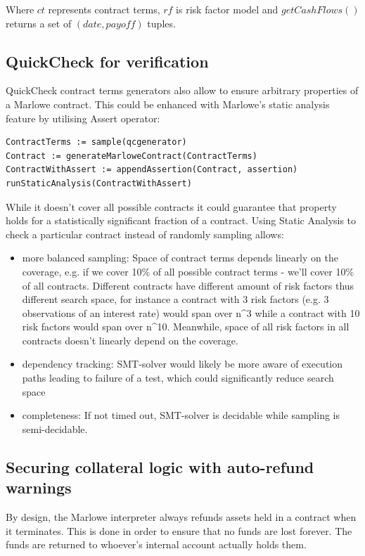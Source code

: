 \documentclass[runningheads]{llncs}
\begin{document}
Where $ct$ represents contract terms, $rf$ is risk factor model and
$getCashFlows()$ returns a set of $(date,payoff)$ tuples.

\subsection{QuickCheck for verification}

QuickCheck\cite{qc} contract terms generators also allow to ensure
arbitrary properties of a Marlowe contract. This could be enhanced
with Marlowe's static analysis feature by utilising Assert operator:

\begin{verbatim}
ContractTerms := sample(qcgenerator) 
Contract := generateMarloweContract(ContractTerms) 
ContractWithAssert := appendAssertion(Contract, assertion) 
runStaticAnalysis(ContractWithAssert)
\end{verbatim}

While it doesn't cover all possible contracts it could guarantee that
property holds for a statistically significant fraction of a contract.
Using Static Analysis to check a particular contract instead of randomly
sampling allows: 
\begin{itemize}
\item more balanced sampling: Space of contract terms depends linearly on
the coverage, e.g. if we cover 10\% of all possible contract terms
- we'll cover 10\% of all contracts. Different contracts have different
amount of risk factors thus different search space, for instance a
contract with 3 risk factors (e.g. 3 observations of an interest rate)
would span over n\textasciicircum 3 while a contract with 10 risk
factors would span over n\textasciicircum 10. Meanwhile, space of
all risk factors in all contracts doesn't linearly depend on the coverage. 
\item dependency tracking: SMT-solver would likely be more aware of execution
paths leading to failure of a test, which could significantly reduce
search space 
\item completeness: If not timed out, SMT-solver is decidable while sampling
is semi-decidable. 
\end{itemize}

\subsection{Securing collateral logic with auto-refund warnings}

By design, the Marlowe interpreter always refunds assets held in a
contract when it terminates. This is done in order to ensure that
no funds are lost forever. The funds are returned to whoever's internal
account actually holds them.
\end{document}
